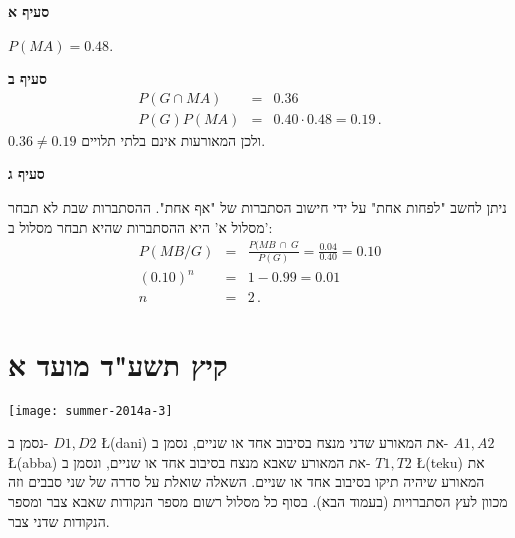 \textbf{סעיף א}

$P(MA)=0.48$.

\textbf{סעיף ב}
\begin{eqnarray*}
P(G\cap MA) &=&0.36\\
P(G)P(MA)&=&0.40\cdot 0.48=0.19\,.
\end{eqnarray*}
$0.36\neq 0.19$
ולכן המאורעות אינם בלתי תלויים.

\textbf{סעיף ג}

ניתן לחשב "לפחות אחת" על ידי חישוב הסתברות של "אף אחת". ההסתברות שבת לא תבחר מסלול א' היא ההסתברות שהיא תבחר מסלול ב':
\begin{eqnarray*}
P(MB/G) &=& \frac{P(MB \:\cap\: G}{P(G)}= \frac{0.04}{0.40}=0.10\\
(0.10)^n&=&1-0.99=0.01\\
n&=&2\,.
\end{eqnarray*}


\section{קיץ תשע"ד מועד א}

\begin{center}
\texttt{[image: summer-2014a-3]}
\end{center}

נסמן ב-%
$D1, D2$ \L{(dani)}
את המאורע שדני מנצח בסיבוב אחד או שניים, נסמן ב-%
$A1, A2$ \L{(abba)}
את המאורע שאבא מנצח בסיבוב אחד או שניים, ונסמן ב-%
$T1, T2$ \L{(teku)}
את המאורע שיהיה תיקו בסיבוב אחד או שניים. השאלה שואלת על סדרה של שני סבבים וזה מכוון לעץ הסתברויות (בעמוד הבא). בסוף כל מסלול רשום מספר הנקודות שאבא צבר ומספר הנקודות שדני צבר.

